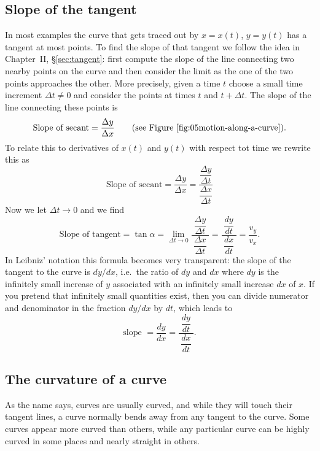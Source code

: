 \subsection{Slope of the tangent}
In most examples the curve that gets traced out by $x=x(t)$, $y=y(t)$ has a
tangent at most points.  To find the slope of that tangent we follow the idea in
Chapter~II, \S\ref{sec:tangent}: first compute the slope of the line connecting two nearby
points on the curve and then consider the limit as the one of the two points
approaches the other.  More precisely, given a time $t$ choose a small time
increment $\Delta t\neq0$ and consider the points at times $t$ and $t+\Delta
t$. The slope of the line connecting these points is
\[
\text{Slope of secant} = \frac{\Delta y}{\Delta x}
\qquad
\text{(see Figure~\ref{fig:05motion-along-a-curve}).}
\]
To relate this to derivatives of $x(t)$ and $y(t)$ with respect tot time we
rewrite this as
\[
\text{Slope of secant} = \frac{\Delta y}{\Delta x} = \frac{\dfrac{\Delta
    y}{\Delta t}}{\dfrac{\Delta x}{\Delta t}}
\]
Now we let $\Delta t\to 0$ and we find
\begin{equation}
  \text{Slope of tangent}
  = \tan\alpha
  = \lim_{\Delta t\to0}
  \frac{\;\dfrac{\Delta y}{\Delta t}\;}{\dfrac{\Delta x}{\Delta t}}
  =\frac{\;\dfrac{dy}{dt}\;}{\dfrac{dx}{dt}}
  =\frac{v_y} {v_x}.
  \label{eq:05slope-of-tangent-parametrized-curve}
\end{equation}
In Leibniz' notation this formula becomes very transparent: the slope of the
tangent to the curve is $dy/dx$, i.e.~the ratio of $dy$ and $dx$ where $dy$ is
the infinitely small increase of $y$ associated with an infinitely small
increase $dx$ of $x$.  If you pretend that infinitely small quantities exist,
then you can divide numerator and denominator in the fraction $dy/dx$ by $dt$,
which leads to
\[
\text{slope }= \frac{dy} {dx} = \frac{\;\dfrac{dy}{dt}\;}{\dfrac{dx} {dt}}.
\]


\subsection{The curvature of a curve}
As the name says, curves are usually curved, and while they will touch
their tangent lines, a curve normally bends away from any tangent to
the curve.  Some curves appear more curved than others, while any
particular curve can be highly curved in some places and nearly
straight in others.

